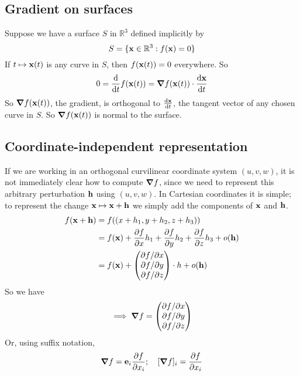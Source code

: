 \subsection{Gradient on surfaces}
Suppose we have a surface \(S\) in \(\mathbb R^3\) defined implicitly by
\[
	S = \{ \vb x \in \mathbb R^3 : f(\vb x) = 0 \}
\]
If \(t \mapsto \vb x(t)\) is any curve in \(S\), then \(f(\vb x(t)) = 0\) everywhere.
So
\[
	0 = \frac{\dd}{\dd{t}}f(\vb x(t)) = \grad f(\vb x(t)) \cdot \frac{\dd \vb x}{\dd{t}}
\]
So \(\grad f(\vb x(t))\), the gradient, is orthogonal to \(\frac{\dd \vb x}{\dd{t}}\), the tangent vector of any chosen curve in \(S\).
So \(\grad f(\vb x(t))\) is normal to the surface.

\subsection{Coordinate-independent representation}
If we are working in an orthogonal curvilinear coordinate system \((u, v, w)\), it is not immediately clear how to compute \(\grad f\), since we need to represent this arbitrary perturbation \(\vb h\) using \((u, v, w)\).
In Cartesian coordinates it is simple; to represent the change \(\vb x \mapsto \vb x + \vb h\) we simply add the components of \(\vb x\) and \(\vb h\).
\begin{align*}
	f(\vb x + \vb h) & = f((x + h_1, y + h_2, z + h_3))                                                                                                  \\
	                 & = f(\vb x) + \frac{\partial f}{\partial x} h_1 + \frac{\partial f}{\partial y} h_2 + \frac{\partial f}{\partial z} h_3 + o(\vb h) \\
	                 & = f(\vb x) + \begin{pmatrix}
		\partial f / \partial x \\ \partial f / \partial y \\ \partial f / \partial z
	\end{pmatrix} \cdot h + o(\vb h)                                                                         \\
\end{align*}
So we have
\[
	\implies \grad f = \begin{pmatrix}
		\partial f / \partial x \\ \partial f / \partial y \\ \partial f / \partial z
	\end{pmatrix}
\]
Or, using suffix notation,
\[
	\grad f = \vb e_i \frac{\partial f}{\partial x_i};\quad [\grad f]_i = \frac{\partial f}{\partial x_i}
\]
